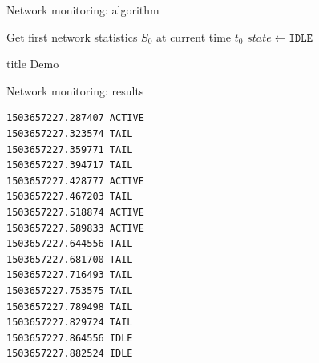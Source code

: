 %
%
\begin{frame}{Network monitoring: algorithm}
\begin{small}
\begin{algorithm}[H]
Get first network statistics $S_0$ at current time $t_0$\;
$state \leftarrow \texttt{IDLE}$\;
\end{algorithm}
\end{small}
\end{frame}
%
%
\begin{frame}
  \vfill
  \centering
  \begin{beamercolorbox}[sep=8pt,center,shadow=true,rounded=true]{title}
    Demo\par%
  \end{beamercolorbox}
  \vfill
\end{frame}
%
%
\begin{frame}[fragile]{Network monitoring: results}
\begin{lstlisting}
1503657227.287407 ACTIVE
1503657227.323574 TAIL
1503657227.359771 TAIL
1503657227.394717 TAIL
1503657227.428777 ACTIVE
1503657227.467203 TAIL
1503657227.518874 ACTIVE
1503657227.589833 ACTIVE
1503657227.644556 TAIL
1503657227.681700 TAIL
1503657227.716493 TAIL
1503657227.753575 TAIL
1503657227.789498 TAIL
1503657227.829724 TAIL
1503657227.864556 IDLE
1503657227.882524 IDLE
\end{lstlisting}
\end{frame}
%
%
